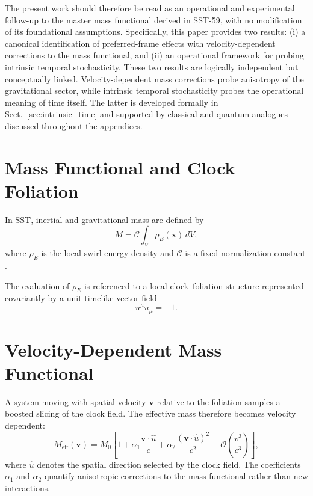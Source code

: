 \documentclass[11pt]{article}
\begin{document}
    The present work should therefore be read as an operational and experimental
    follow-up to the master mass functional derived in SST-59, with no modification
    of its foundational assumptions.
    Specifically, this paper provides two results:
    (i) a canonical identification of preferred-frame effects with
    velocity-dependent corrections to the mass functional, and
    (ii) an operational framework for probing intrinsic temporal stochasticity.
    These two results are logically independent but conceptually linked.
    Velocity-dependent mass corrections probe anisotropy of the gravitational sector,
    while intrinsic temporal stochasticity probes the operational meaning of time itself.
    The latter is developed formally in Sect.~\ref{sec:intrinsic_time} and supported by
    classical and quantum analogues discussed throughout the appendices.

    \section{Mass Functional and Clock Foliation}

        In SST, inertial and gravitational mass are defined by
        \begin{equation}
            M = \mathcal{C} \int_V \rho_{\!E}(\mathbf{x})\, dV ,
        \end{equation}
        where $\rho_{\!E}$ is the local swirl energy density and $\mathcal{C}$ is a fixed
        normalization constant \cite{SST59}.

        The evaluation of $\rho_{\!E}$ is referenced to a local clock--foliation structure
        represented covariantly by a unit timelike vector field
        \begin{equation}
            u^\mu u_\mu = -1 .
        \end{equation}

    \section{Velocity-Dependent Mass Functional}

        A system moving with spatial velocity $\mathbf{v}$ relative to the foliation samples
        a boosted slicing of the clock field.
        The effective mass therefore becomes velocity dependent:
        \begin{equation}
            M_{\mathrm{eff}}(\mathbf{v})
            =
            M_0
            \left[
                1
                + \alpha_1 \frac{\mathbf{v}\cdot\hat{u}}{c}
                + \alpha_2 \frac{(\mathbf{v}\cdot\hat{u})^2}{c^2}
                + \mathcal{O}\!\left(\frac{v^3}{c^3}\right)
            \right],
        \end{equation}
        where $\hat{u}$ denotes the spatial direction selected by the clock field.
        The coefficients $\alpha_1$ and $\alpha_2$ quantify anisotropic corrections to the
        mass functional rather than new interactions.
\end{document}
